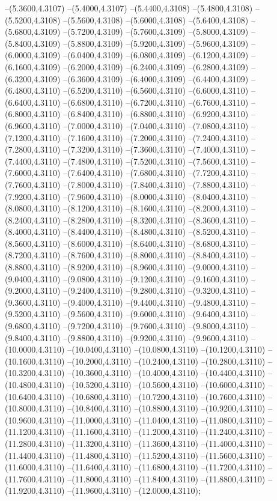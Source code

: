 {	--(5.3600,4.3107)
	--(5.4000,4.3107)
	--(5.4400,4.3108)
	--(5.4800,4.3108)
	--(5.5200,4.3108)
	--(5.5600,4.3108)
	--(5.6000,4.3108)
	--(5.6400,4.3108)
	--(5.6800,4.3109)
	--(5.7200,4.3109)
	--(5.7600,4.3109)
	--(5.8000,4.3109)
	--(5.8400,4.3109)
	--(5.8800,4.3109)
	--(5.9200,4.3109)
	--(5.9600,4.3109)
	--(6.0000,4.3109)
	--(6.0400,4.3109)
	--(6.0800,4.3109)
	--(6.1200,4.3109)
	--(6.1600,4.3109)
	--(6.2000,4.3109)
	--(6.2400,4.3109)
	--(6.2800,4.3109)
	--(6.3200,4.3109)
	--(6.3600,4.3109)
	--(6.4000,4.3109)
	--(6.4400,4.3109)
	--(6.4800,4.3110)
	--(6.5200,4.3110)
	--(6.5600,4.3110)
	--(6.6000,4.3110)
	--(6.6400,4.3110)
	--(6.6800,4.3110)
	--(6.7200,4.3110)
	--(6.7600,4.3110)
	--(6.8000,4.3110)
	--(6.8400,4.3110)
	--(6.8800,4.3110)
	--(6.9200,4.3110)
	--(6.9600,4.3110)
	--(7.0000,4.3110)
	--(7.0400,4.3110)
	--(7.0800,4.3110)
	--(7.1200,4.3110)
	--(7.1600,4.3110)
	--(7.2000,4.3110)
	--(7.2400,4.3110)
	--(7.2800,4.3110)
	--(7.3200,4.3110)
	--(7.3600,4.3110)
	--(7.4000,4.3110)
	--(7.4400,4.3110)
	--(7.4800,4.3110)
	--(7.5200,4.3110)
	--(7.5600,4.3110)
	--(7.6000,4.3110)
	--(7.6400,4.3110)
	--(7.6800,4.3110)
	--(7.7200,4.3110)
	--(7.7600,4.3110)
	--(7.8000,4.3110)
	--(7.8400,4.3110)
	--(7.8800,4.3110)
	--(7.9200,4.3110)
	--(7.9600,4.3110)
	--(8.0000,4.3110)
	--(8.0400,4.3110)
	--(8.0800,4.3110)
	--(8.1200,4.3110)
	--(8.1600,4.3110)
	--(8.2000,4.3110)
	--(8.2400,4.3110)
	--(8.2800,4.3110)
	--(8.3200,4.3110)
	--(8.3600,4.3110)
	--(8.4000,4.3110)
	--(8.4400,4.3110)
	--(8.4800,4.3110)
	--(8.5200,4.3110)
	--(8.5600,4.3110)
	--(8.6000,4.3110)
	--(8.6400,4.3110)
	--(8.6800,4.3110)
	--(8.7200,4.3110)
	--(8.7600,4.3110)
	--(8.8000,4.3110)
	--(8.8400,4.3110)
	--(8.8800,4.3110)
	--(8.9200,4.3110)
	--(8.9600,4.3110)
	--(9.0000,4.3110)
	--(9.0400,4.3110)
	--(9.0800,4.3110)
	--(9.1200,4.3110)
	--(9.1600,4.3110)
	--(9.2000,4.3110)
	--(9.2400,4.3110)
	--(9.2800,4.3110)
	--(9.3200,4.3110)
	--(9.3600,4.3110)
	--(9.4000,4.3110)
	--(9.4400,4.3110)
	--(9.4800,4.3110)
	--(9.5200,4.3110)
	--(9.5600,4.3110)
	--(9.6000,4.3110)
	--(9.6400,4.3110)
	--(9.6800,4.3110)
	--(9.7200,4.3110)
	--(9.7600,4.3110)
	--(9.8000,4.3110)
	--(9.8400,4.3110)
	--(9.8800,4.3110)
	--(9.9200,4.3110)
	--(9.9600,4.3110)
	--(10.0000,4.3110)
	--(10.0400,4.3110)
	--(10.0800,4.3110)
	--(10.1200,4.3110)
	--(10.1600,4.3110)
	--(10.2000,4.3110)
	--(10.2400,4.3110)
	--(10.2800,4.3110)
	--(10.3200,4.3110)
	--(10.3600,4.3110)
	--(10.4000,4.3110)
	--(10.4400,4.3110)
	--(10.4800,4.3110)
	--(10.5200,4.3110)
	--(10.5600,4.3110)
	--(10.6000,4.3110)
	--(10.6400,4.3110)
	--(10.6800,4.3110)
	--(10.7200,4.3110)
	--(10.7600,4.3110)
	--(10.8000,4.3110)
	--(10.8400,4.3110)
	--(10.8800,4.3110)
	--(10.9200,4.3110)
	--(10.9600,4.3110)
	--(11.0000,4.3110)
	--(11.0400,4.3110)
	--(11.0800,4.3110)
	--(11.1200,4.3110)
	--(11.1600,4.3110)
	--(11.2000,4.3110)
	--(11.2400,4.3110)
	--(11.2800,4.3110)
	--(11.3200,4.3110)
	--(11.3600,4.3110)
	--(11.4000,4.3110)
	--(11.4400,4.3110)
	--(11.4800,4.3110)
	--(11.5200,4.3110)
	--(11.5600,4.3110)
	--(11.6000,4.3110)
	--(11.6400,4.3110)
	--(11.6800,4.3110)
	--(11.7200,4.3110)
	--(11.7600,4.3110)
	--(11.8000,4.3110)
	--(11.8400,4.3110)
	--(11.8800,4.3110)
	--(11.9200,4.3110)
	--(11.9600,4.3110)
	--(12.0000,4.3110);
}
